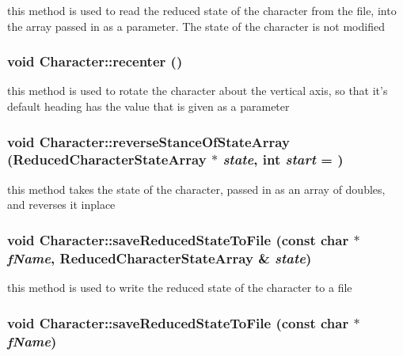 \label{classCartWheel_1_1Core_1_1Character_a888c025d010c24ad3ca3aa19fad65e11}
this method is used to read the reduced state of the character from the file, into the array passed in as a parameter. The state of the character is not modified \hypertarget{classCartWheel_1_1Core_1_1Character_a4f837b80e4f72d1b7c995723317d4c37}{
\subsubsection[{recenter}]{\setlength{\rightskip}{0pt plus 5cm}void Character::recenter ()}}
\label{classCartWheel_1_1Core_1_1Character_a4f837b80e4f72d1b7c995723317d4c37}
this method is used to rotate the character about the vertical axis, so that it's default heading has the value that is given as a parameter \hypertarget{classCartWheel_1_1Core_1_1Character_a58222b9166b9117f02ccf7c62c81e8e6}{
\subsubsection[{reverseStanceOfStateArray}]{\setlength{\rightskip}{0pt plus 5cm}void Character::reverseStanceOfStateArray ({\bf ReducedCharacterStateArray} $\ast$ {\em state}, \/  int {\em start} = {})}}
\label{classCartWheel_1_1Core_1_1Character_a58222b9166b9117f02ccf7c62c81e8e6}
this method takes the state of the character, passed in as an array of doubles, and reverses it inplace \hypertarget{classCartWheel_1_1Core_1_1Character_aa3050f472d91fa5ead537e8ad6d51a7e}{
\subsubsection[{saveReducedStateToFile}]{\setlength{\rightskip}{0pt plus 5cm}void Character::saveReducedStateToFile (const char $\ast$ {\em fName}, \/  {\bf ReducedCharacterStateArray} \& {\em state})}}
\label{classCartWheel_1_1Core_1_1Character_aa3050f472d91fa5ead537e8ad6d51a7e}
this method is used to write the reduced state of the character to a file \hypertarget{classCartWheel_1_1Core_1_1Character_a9b5120d9522efa88fb44c0582e5aabd8}{
\subsubsection[{saveReducedStateToFile}]{\setlength{\rightskip}{0pt plus 5cm}void Character::saveReducedStateToFile (const char $\ast$ {\em fName})}}
